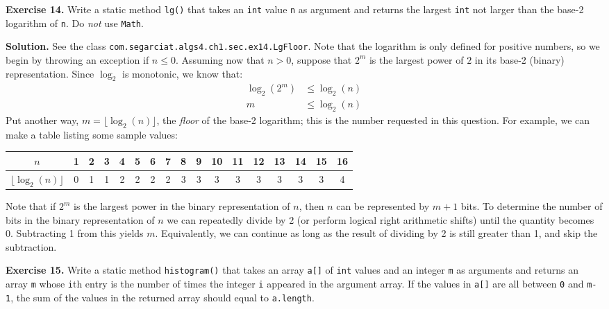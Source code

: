 \documentclass[12pt, a4paper]{article}
\newenvironment{ex}[2][Exercise]
{\par\medskip\noindent \textbf{#1 #2.}}
{\medskip}
\newenvironment{sol}[1][Solution]
{\par\medskip\noindent \textbf{#1.} }
{\medskip}
\begin{document}
	\begin{ex}{14}
		Write a static method \texttt{lg()} that takes an \texttt{int} value \texttt{n}
		as argument and returns the largest \texttt{int} not larger than the base-2 logarithm
		of \texttt{n}. Do \emph{not} use \texttt{Math}.
	\end{ex}
	\begin{sol}
		See the class \texttt{com.segarciat.algs4.ch1.sec.ex14.LgFloor}.
		Note that the logarithm is only defined for positive numbers,
		so we begin by throwing an exception if $n \leq 0$. Assuming now that
		$n > 0$, suppose that $2^m$ is the largest power of $2$ in its base-2 (binary)
		representation. Since $\log_2$ is monotonic, we know that:
		\begin{align*}
			\log_2(2^m)&\leq \log_2(n)\\
			m&\leq  \log_2(n)
		\end{align*}
		Put another way, $m = \lfloor \log_2(n)\rfloor$, the \emph{floor} of the base-2
		logarithm; this is the number requested in this question. For example, we can
		make a table listing some sample values:
		\begin{center}
			\begin{tabular}{c|cccccccccccccccc}
				$n$ & 1 & 2 & 3 & 4 & 5 & 6 & 7 & 8 & 9 & 10 & 11 & 12 & 13 & 14 & 15 & 16\\
				\hline
				$\lfloor \log_2(n)\rfloor$ & 0 & 1 & 1 & 2 & 2 & 2 & 2 & 3 & 3 & 3 & 3 & 3 & 3
				& 3 & 3 & 4
			\end{tabular}
		\end{center}
		Note that if $2^m$ is the largest power in the binary representation of $n$, then
		$n$ can be represented by $m + 1$ bits. To determine the number of bits in the
		binary representation of $n$ we can repeatedly divide by 2 (or perform logical right
		arithmetic shifts) until the quantity becomes 0. Subtracting 1 from this yields
		$m$. Equivalently, we can continue as long as the result of dividing by 2 is still
		greater than 1, and skip the subtraction.
	\end{sol}
	\begin{ex}{15}
		Write a static method \texttt{histogram()} that takes an array \texttt{a[]}
		of \texttt{int} values and an integer \texttt{m} as arguments and returns
		an array \texttt{m} whose \texttt{i}th entry is the number of times the integer
		\texttt{i} appeared in the argument array. If the values in \texttt{a[]} are all
		between \texttt{0} and \texttt{m-1}, the sum of the values in the returned array
		should equal to \texttt{a.length}.
	\end{ex}
\end{document}
